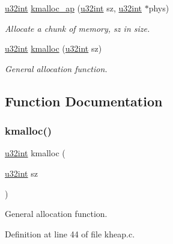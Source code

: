 \begin{DoxyCompactItemize}
\hyperlink{a00116_a7ae3a26c17ddfe117c6291739780801d_a7ae3a26c17ddfe117c6291739780801d}{u32int} \hyperlink{a00065_ab4fd209369f6c18acead48b80e7f09c7_ab4fd209369f6c18acead48b80e7f09c7}{kmalloc\+\_\+ap} (\hyperlink{a00116_a7ae3a26c17ddfe117c6291739780801d_a7ae3a26c17ddfe117c6291739780801d}{u32int} sz, \hyperlink{a00116_a7ae3a26c17ddfe117c6291739780801d_a7ae3a26c17ddfe117c6291739780801d}{u32int} $\ast$phys)
\begin{DoxyCompactList}\small\item\em Allocate a chunk of memory, sz in size. \end{DoxyCompactList}\item 
\hyperlink{a00116_a7ae3a26c17ddfe117c6291739780801d_a7ae3a26c17ddfe117c6291739780801d}{u32int} \hyperlink{a00065_a57133c6165a95f09de1806a08042e5e0_a57133c6165a95f09de1806a08042e5e0}{kmalloc} (\hyperlink{a00116_a7ae3a26c17ddfe117c6291739780801d_a7ae3a26c17ddfe117c6291739780801d}{u32int} sz)
\begin{DoxyCompactList}\small\item\em General allocation function. \end{DoxyCompactList}\end{DoxyCompactItemize}


\subsection{Function Documentation}
\mbox{\label{a00065_a57133c6165a95f09de1806a08042e5e0_a57133c6165a95f09de1806a08042e5e0}} 
\subsubsection{\texorpdfstring{kmalloc()}{kmalloc()}}
{\footnotesize\ttfamily \hyperlink{a00116_a7ae3a26c17ddfe117c6291739780801d_a7ae3a26c17ddfe117c6291739780801d}{u32int} kmalloc (\begin{DoxyParamCaption}\item[{\hyperlink{a00116_a7ae3a26c17ddfe117c6291739780801d_a7ae3a26c17ddfe117c6291739780801d}{u32int}}]{sz }\end{DoxyParamCaption})}



General allocation function. 



Definition at line 44 of file kheap.\+c.


